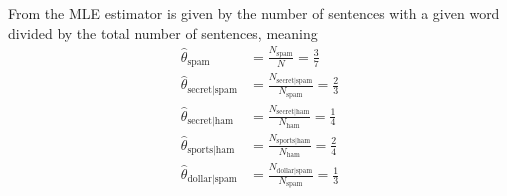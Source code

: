 \begin{example}
	From \citep[p. 85]{murphy2013machine} the MLE estimator is given by the number of sentences with a given word divided by the total number of sentences, meaning
	\begin{equation}
		\begin{split}
			\hat{\theta}_{\text{spam}} & = \frac{N_{\text{spam}}}{N} = \frac{3}{7}\\
			\hat{\theta}_{\text{secret|spam}} & = \frac{N_{\text{secret|spam}}}{N_{\text{spam}}} = \frac{2}{3}\\
			\hat{\theta}_{\text{secret|ham}} & = \frac{N_{\text{secret|ham}}}{N_{\text{ham}}} = \frac{1}{4}\\
			\hat{\theta}_{\text{sports|ham}} & = \frac{N_{\text{sports|ham}}}{N_{\text{ham}}} = \frac{2}{4}\\
			\hat{\theta}_{\text{dollar|spam}} & = \frac{N_{\text{dollar|spam}}}{N_{\text{spam}}} = \frac{1}{3}\\
		\end{split}
	\end{equation}
\end{example}



